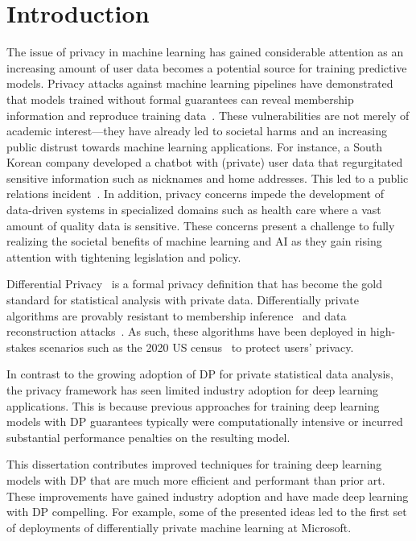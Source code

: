 \chapter{Introduction}

The issue of privacy in machine learning has gained considerable attention as an increasing amount of user data becomes a potential source for training predictive models.
Privacy attacks against machine learning pipelines have demonstrated that models trained without formal guarantees can reveal membership information and reproduce training data~\cite{shokri2017membership,carlini2021extracting}.
These vulnerabilities are not merely of academic interest---they have already led to societal harms and an increasing public distrust towards machine learning applications.
For instance, a South Korean company developed a chatbot with (private) user data that regurgitated sensitive information such as nicknames and home addresses. This led to a public relations incident~\cite{sk-chatbot}.
In addition, privacy concerns impede the development of data-driven systems in specialized domains such as health care where a vast amount of quality data is sensitive.
These concerns present a challenge to fully realizing the societal benefits of machine learning and AI as they gain rising attention with tightening legislation and policy.

Differential Privacy~\cite[DP]{dwork2014algorithmic} is a formal privacy definition that has become the gold standard for statistical analysis with private data.
Differentially private algorithms are provably resistant to membership inference~\cite{yeom2018privacy,wasserman2010statistical} and data reconstruction attacks~\cite{pmlr-v162-guo22c,hayes2023bounding}.
As such, these algorithms have been deployed in high-stakes scenarios such as the 2020 US census~\cite{us-census} to protect users' privacy.

In contrast to the growing adoption of DP for private statistical data analysis, the privacy framework has seen limited industry adoption for deep learning applications.
This is because previous approaches for training deep learning models with DP guarantees typically were computationally intensive or incurred substantial performance penalties on the resulting model.

This dissertation contributes improved techniques for training deep learning models with DP that are much more efficient and performant than prior art.
These improvements have gained industry adoption and have made deep learning with DP compelling.
For example, some of the presented ideas led to the first set of deployments of differentially private machine learning at Microsoft.

